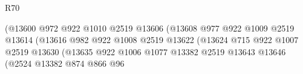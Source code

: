 \begin{lexlean}{R70}
\begin{coremodule}
                                                          (@13600
                                                            @972
                                                            @922
                                                            @1010
                                                            @2519
                                                            @13606
                                                            (@13608
                                                              @977
                                                              @922
                                                              @1009
                                                              @2519
                                                              @13614
                                                              (@13616
                                                                @982
                                                                @922
                                                                @1008
                                                                @2519
                                                                @13622
                                                                (@13624
                                                                  @715
                                                                  @922
                                                                  @1007
                                                                  @2519
                                                                  @13630
                                                                  (@13635
                                                                    @922
                                                                    @1006
                                                                    @1077
                                                                    @13382
                                                                    @2519
                                                                    @13643
                                                                    @13646
                                                                    (@2524
                                                                      @13382
                                                                      @874
                                                                      @866
                                                                      @96

\end{coremodule}
\end{lexlean}

